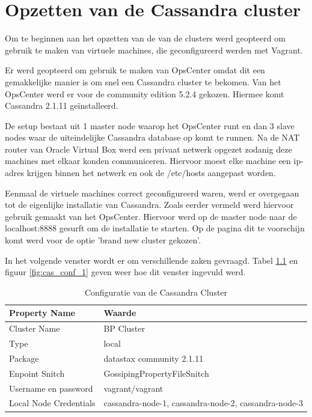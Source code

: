 \chapter{Opzetten van de Cassandra cluster}
\label{ch:cassandra_cluster}

Om te beginnen aan het opzetten van de van de clusters werd geopteerd om gebruik te maken van virtuele machines, die geconfigureerd werden met Vagrant.

Er werd geopteerd om gebruik te maken van OpsCenter omdat dit een gemakkelijke manier is om snel een Cassandra cluster te bekomen.
Van het OpsCenter werd er voor de community edition 5.2.4 gekozen.
Hiermee komt Cassandra 2.1.11 geïnstalleerd.


De setup bestaat uit 1 master node waarop het OpsCenter runt en dan 3 slave nodes waar de uiteindelijke Cassandra database op komt te runnen.
Na de NAT router van Oracle Virtual Box werd een privaat netwerk opgezet zodanig deze machines met elkaar konden communiceren.
Hiervoor moest elke machine een ip-adres krijgen binnen het netwerk en ook de /etc/hosts aangepast worden.

Eenmaal de virtuele machines correct geconfigureerd waren, werd er overgegaan tot de eigenlijke installatie van Cassandra.
Zoals eerder vermeld werd hiervoor gebruik gemaakt van het OpsCenter.
Hiervoor werd op de master node naar de localhost:8888 gesurft om de installatie te starten. Op de pagina dit te voorschijn komt werd voor de optie 'brand new cluster gekozen'.

In het volgende venster wordt er om verschillende zaken gevraagd.
Tabel \ref{tab:cas_conf} en figuur \ref{fig:cas_conf_1} geven weer hoe dit venster ingevuld werd.

\begin{table}[H]
  \begin{tabular}{|l|l|}
  \hline
  Property Name & Waarde \\
  \hline
  \hline
  Cluster Name & BP Cluster \\
  \hline
  Type & local \\
  \hline
  Package & datastax community 2.1.11 \\
  \hline
  Enpoint Snitch & GossipingPropertyFileSnitch \\
  \hline
  Username en password & vagrant/vagrant\\
  \hline
  Local Node Credentials & cassandra-node-1, cassandra-node-2, cassandra-node-3 \\
  \hline
  \end{tabular}
  \caption{Configuratie van de Cassandra Cluster}
  \label{tab:cas_conf}
\end{table}

